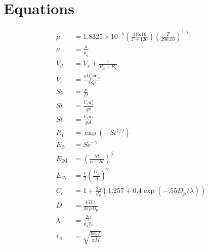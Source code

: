 \documentclass{article}
\begin{document}

\section{Equations}
\label{sec:equations}

\begin{align}
\mu & =  1.8325 \times 10^{-5}\left(\frac{416.16}{T + 120}\right)\left(\frac{T}{296.16}\right)^{1.5}\label{eq:dynamic_visc}\\
\nu & = \frac{\mu}{\rho_a}  \label{eq:kinematic_visc}\\
V_d &= V_s + \frac{1}{R_a + R_s} \label{eq:vd}\\
V_s & = \frac{\rho D_p^2gC_c}{18\mu } \label{eq:vs}\\
Sc &= \frac{\nu}{D}   \label{eq:sc} \\
St &= \frac{V_su_*^2}{g \nu } \label{eq:st_smooth}\\
St &= \frac{V_s u_*}{gA}  \label{eq:st_veg}\\
R_1 &= \exp(-St^{1/2}) \label{eq:R_1}\\
E_{\textrm{B}} &= Sc^{-\gamma}  \label{eq:eb}\\
E_{\textrm{IM}} & = \left(\frac{St}{\alpha + St}\right)^{\beta} \label{eq:eim}\\
E_{\textrm{IN}} &= \frac{1}{2} \left(\frac{D_p}{A}\right)^2 \label{eq:ein}\\
C_c & = 1 + \frac{2 \lambda}{d_p}\left(1.257 + 0.4\exp(-.55 D_p/\lambda)\right)  \label{eq:cc}\\ 
D & = \frac{kTC_c}{3 \pi \mu D_p}  \label{eq:brownian}\\
\lambda & = \frac{2 \mu}{\rho_a v_a} \label{eq:lambda}\\
\bar{v}_a & = \sqrt{\frac{8k_bT}{\pi\bar{M}}} \label{eq:thermal}
\end{align}
\end{document}
